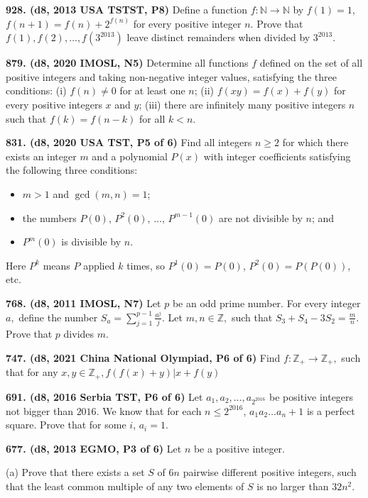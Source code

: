 \documentclass{article}
\begin{document}
\textbf{928. (\color{red}d8\color{black}, 2013 USA TSTST, P8)} Define a function \(f : \mathbb{N} \to \mathbb{N}\) by \(f(1) = 1\), \(f(n+1) = f(n) + 2^{f(n)}\) for every positive integer \(n\). Prove that \(f(1), f(2), \dots, f(3^{2013})\) leave distinct remainders when divided by \(3^{2013}\).

\textbf{879. (\color{red}d8\color{black}, 2020 IMOSL, N5)} Determine all functions $f$ defined on the set of all positive integers and taking non-negative integer values, satisfying the three conditions:
(i) $f(n) \neq 0$ for at least one $n$;
(ii) $f(x y)=f(x)+f(y)$ for every positive integers $x$ and $y$;
(iii) there are infinitely many positive integers $n$ such that $f(k)=f(n-k)$ for all $k<n$.

\textbf{831. (\color{red}d8\color{black}, 2020 USA TST, P5 of 6)} Find all integers $n \ge 2$ for which there exists an integer $m$ and a polynomial $P(x)$ with integer coefficients satisfying the following three conditions:
\begin{itemize}
    \item $m > 1$ and $\gcd(m,n) = 1$;
    \item the numbers $P(0)$, $P^2(0)$, $\ldots$, $P^{m-1}(0)$ are not divisible by $n$; and
    \item $P^m(0)$ is divisible by $n$.
\end{itemize}
Here $P^k$ means $P$ applied $k$ times, so $P^1(0) = P(0)$, $P^2(0) = P(P(0))$, etc.

\textbf{768. (\color{red}d8\color{black}, 2011 IMOSL, N7)} Let $p$ be an odd prime number. For every integer $a,$ define the number $S_a = \sum^{p-1}_{j=1} \frac{a^j}{j}.$ Let $m,n \in \mathbb{Z},$ such that $S_3 + S_4 - 3S_2 = \frac{m}{n}.$ Prove that $p$ divides $m.$

\textbf{747. (\color{red}d8\color{black}, 2021 China National Olympiad, P6 of 6)} Find $f: \mathbb{Z}_{+} \rightarrow \mathbb{Z}_{+},$ such that for any $x, y \in \mathbb{Z}_{+}, f(f(x)+y) | x+f(y)$

\textbf{691. (\color{red}d8\color{black}, 2016 Serbia TST, P6 of 6)} Let $a_1, a_2, \dots, a_{2^{2016}}$ be positive integers not bigger than $2016$. We know that for each $n \leq 2^{2016}$, $a_1a_2 \dots a_{n} +1 $ is a perfect square. Prove that for some $i $, $a_i=1$.

\textbf{677. (\color{red}d8\color{black}, 2013 EGMO, P3 of 6)} Let $n$ be a positive integer.

(a) Prove that there exists a set $S$ of $6n$ pairwise different positive integers, such that the least common multiple of any two elements of $S$ is no larger than $32n^2$.
\end{document}

